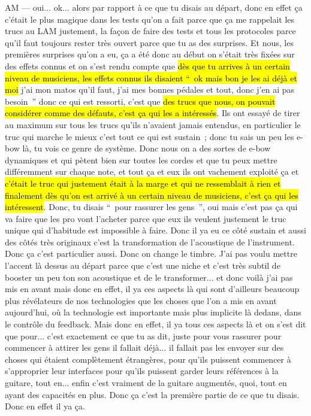 AM — oui... ok... alors par rapport à ce que tu disais au départ, donc en effet ça c'était le plus magique dans les tests qu'on a fait parce que ça me rappelait les trucs au LAM justement, la façon de faire des tests et tous les protocoles parce qu'il faut toujours rester très ouvert parce que tu as des surprises. Et nous, les premières surprises qu'on a eu, ça a été donc au début on s'était très fixées sur des effets connus et on s'est rendu compte que \hl{dès que tu arrives à un certain niveau de musiciens, les effets connus ils disaient “ ok mais bon je les ai déjà et moi} j'ai mon matos qu'il faut, j'ai mes bonnes pédales et tout, donc j'en ai pas besoin ” donc ce qui est ressorti, c'est que \hl{des trucs que nous, on pouvait considérer comme des défauts, c'est ça qui les a intéressés}. Ils ont essayé de tirer au maximum sur tous les trucs qu'ils n'avaient jamais entendus, en particulier le truc qui marche le mieux c'est tout ce qui est sustain ; donc tu sais un peu les \gls{e-bow} là, tu vois ce genre de système. Donc nous on a des sortes de e-bow dynamiques et qui pètent bien sur toutes les cordes et que tu peux mettre différemment sur chaque note, et tout ça et eux ils ont vachement exploité ça et \hl{c'était le truc qui justement était à la marge et qui ne ressemblait à rien et finalement dès qu'on est arrivé à un certain niveau de musiciens, c'est ça qui les intéressent}. Donc, tu disais “ pour rassurer les gens ”, oui mais c'est pas ça qui va faire que les pro vont l'acheter parce que eux ils veulent justement le truc unique qui d'habitude est impossible à faire. Donc il ya eu ce côté sustain et aussi des côtés très originaux c'est la transformation de l'acoustique de l'instrument. Donc ça c'est particulier aussi. Donc on change le timbre. J'ai pas voulu mettre l'accent là dessus au départ parce que c'est une niche et c'est très subtil de booster un peu ton son acoustique et de le transformer... et donc voilà j'ai pas mis en avant mais donc en effet, il ya ces aspects là qui sont d'ailleurs beaucoup plus révélateurs de nos technologies que les choses que l'on a mis en avant aujourd'hui, où la technologie est importante mais plus implicite là dedans, dans le contrôle du feedback. Mais donc en effet, il ya tous ces aspects là et on s'est dit que pour... c'est exactement ce que tu as dit, juste pour vous rassurer pour commencer à attirer les gens il fallait déjà... il fallait pas les envoyer sur des choses qui étaient complètement étrangères, pour qu'ils puissent commencer à s'approprier leur interfaces pour qu'ils puissent garder leurs références à la guitare, tout en... enfin c'est vraiment de la guitare augmentés, quoi, tout en ayant des capacités en plus. Donc ça c'est la première partie de ce que tu disais. Donc en effet il ya ça. 

